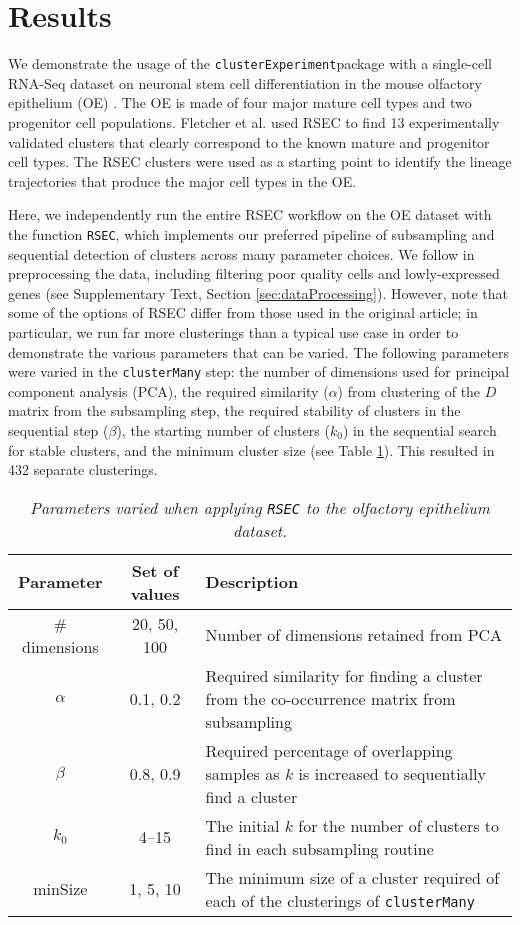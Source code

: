 \documentclass[10pt,letterpaper]{article}
\newcommand{\f}[1]{\texttt{#1}}
\newcommand{\CE}{\f{clusterExperiment}}
\begin{document}
\section{Results}

We demonstrate the usage of the \CE package with a single-cell RNA-Seq dataset on neuronal stem cell differentiation in the mouse olfactory epithelium (OE) \cite{Fletcher:2017fq}.
The OE is made of four major mature cell types and two progenitor cell populations. Fletcher et al. \cite{Fletcher:2017fq} used RSEC to find 13 experimentally validated clusters that clearly correspond to the known mature and progenitor cell types. The RSEC clusters were used as a starting point to identify the lineage trajectories that produce the major cell types in the OE.


Here, we independently run the entire RSEC workflow on the OE dataset with the function \f{RSEC}, which implements our preferred pipeline of subsampling and sequential detection of clusters across many parameter choices. We follow \cite{Fletcher:2017fq} in preprocessing the data, including filtering poor quality cells and lowly-expressed genes  (see Supplementary Text, Section \ref{sec:dataProcessing}). However, note that some of the options of RSEC differ from those used in the original article; in particular, we run far more clusterings than a typical use case in order to demonstrate the various parameters that can be varied. The following parameters were varied in the \f{clusterMany} step: the number of dimensions used for principal component analysis (PCA), the required similarity ($\alpha$) from clustering of the $D$ matrix from the subsampling step, the required stability of clusters in the sequential step ($\beta$), the starting number of clusters ($k_0$) in the sequential search for stable clusters, and the minimum cluster size (see Table \ref{tab:params}).  This resulted in 432 separate clusterings.

\begin{table}
	\begin{tabular}{ccp{3in}}
		Parameter & Set of values  & Description\\ \hline
		\# dimensions & 20, 50, 100 & Number of dimensions retained from PCA\\
		$\alpha$ & 0.1, 0.2 & Required similarity for finding a cluster from the co-occurrence matrix from subsampling\\
		$\beta$ & 0.8, 0.9 & Required percentage of overlapping samples as $k$ is increased to sequentially find a cluster\\
		$k_0$ & 4--15 & The initial $k$ for the number of clusters to find in each subsampling routine \\
		minSize & 1, 5, 10 & The minimum size of a cluster required of each of the clusterings of \f{clusterMany}
	\end{tabular}
\caption{{\em Parameters varied when applying \f{RSEC} to the olfactory epithelium dataset.} }
\label{tab:params}
\end{table}
\end{document}
